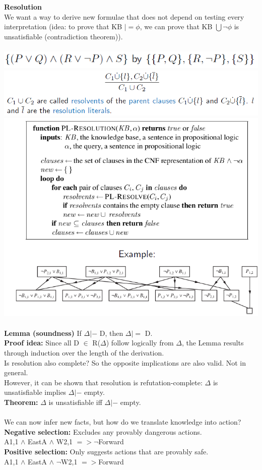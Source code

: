 \documentclass{article}
\begin{document}
\textbf{Resolution}\\
We want a way to derive new formulae that does not depend on testing every interpretation (idea: to prove that KB $|=\phi$, we can prove that KB $\bigcup${$\neg \phi$} is unsatisfiable (contradiction theorem)).\\\\
\includegraphics[scale=0.6]{34.png}\\
\includegraphics[scale=0.6]{35.png}\\
\includegraphics[scale=0.8]{33.png}\\\\
\textbf{Lemma (soundness)} If $\Delta |-$ D, then $\Delta |=$ D.\\
\textbf{Proof idea:} Since all D $\in$ R($\Delta$) follow logically from $\Delta$, the Lemma results through induction over the length of the derivation.\\
Is resolution also complete? So the opposite implications are also valid. Not in general.\\
However, it can be shown that resolution is refutation-complete: $\Delta$ is
unsatisfiable implies $\Delta |-$ empty.\\
\textbf{Theorem:} $\Delta$ is unsatisfiable iff $\Delta |-$ empty.\\\\
We can now infer new facts, but how do we translate knowledge into action?\\
\textbf{Negative selection: }Excludes any provably dangerous actions.\\
A1,1 $\wedge$ EastA $\wedge$ W2,1 $=> \neg$Forward\\
\textbf{Positive selection: }Only suggests actions that are provably safe.\\
A1,1 $\wedge$ EastA $\wedge$ $\neg$W2,1 $=> $Forward\\\\
\end{document}
